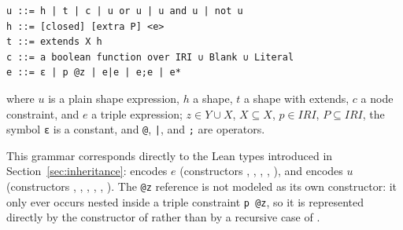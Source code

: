 \documentclass[runningheads]{llncs}
\newcommand{\pcode}[1]{\texttt{\scriptsize #1}}
\begin{document}
\begingroup\scriptsize
\begin{verbatim}
u ::= h | t | c | u or u | u and u | not u
h ::= [closed] [extra P] <e>
t ::= extends X h
c ::= a boolean function over IRI ∪ Blank ∪ Literal
e ::= ε | p @z | e|e | e;e | e*
\end{verbatim}
\endgroup

where $u$ is a plain shape expression, $h$ a shape, $t$ a shape with
extends, $c$ a node constraint, and $e$ a triple expression; $z \in Y \cup
X$, $X \subseteq X$, $p \in IRI$, $P \subseteq IRI$, the symbol
\pcode{ε} is a constant, and \pcode{@}, \pcode{|}, \pcode{*} and
\pcode{;} are operators.

This grammar corresponds directly to the Lean types introduced in
Section~\ref{sec:inheritance}:  encodes $e$ (constructors
, , , , ), and
 encodes $u$ (constructors , ,
, , , ). The \pcode{@z}
reference is not modeled as its own constructor: it only ever occurs
nested inside a triple constraint \pcode{p @z}, so it is represented
directly by the  constructor of  rather than by a
recursive case of .
\end{document}

